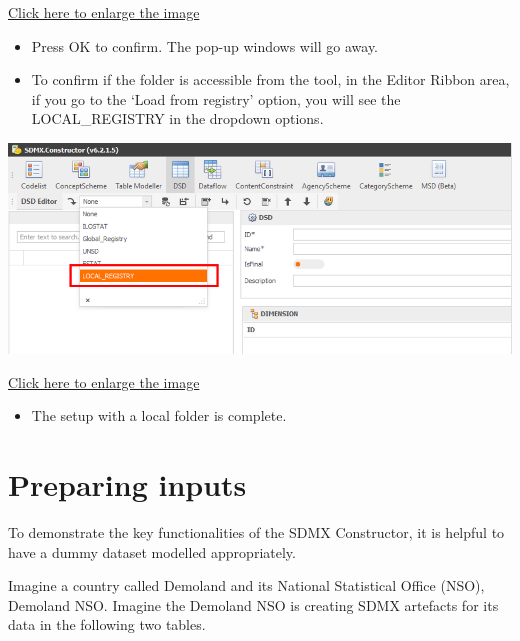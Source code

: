 \documentclass[
]{book}
\providecommand{\tightlist}{%
  \setlength{\itemsep}{0pt}\setlength{\parskip}{0pt}}
\begin{document}
\href{images/image056.png}{Click here to enlarge the image}

\begin{itemize}
\tightlist
\item
  Press OK to confirm. The pop-up windows will go away.
\item
  To confirm if the folder is accessible from the tool, in the Editor Ribbon area, if you go to the `Load from registry' option, you will see the LOCAL\_REGISTRY in the dropdown options.
\end{itemize}

\begin{center}\includegraphics[width=1\linewidth]{./images/image058} \end{center}

\href{images/image058.png}{Click here to enlarge the image}

\begin{itemize}
\tightlist
\item
  The setup with a local folder is complete.
\end{itemize}

\hypertarget{preparing-inputs}{%
\section{Preparing inputs}\label{preparing-inputs}}

To demonstrate the key functionalities of the SDMX Constructor, it is helpful to have a dummy dataset modelled appropriately.

Imagine a country called Demoland and its National Statistical Office (NSO), Demoland NSO. Imagine the Demoland NSO is creating SDMX artefacts for its data in the following two tables.
\end{document}
